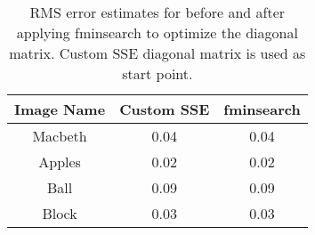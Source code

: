 \documentclass[12pt]{report}
\begin{document}
\begin{enumerate}
    \begin{table}[h!]
    \begin{center}
    \begin{tabular}{ | c | c | c | } 
        \hline
        Image Name & Custom SSE & fminsearch \\ 
        \hline \hline
        Macbeth & 0.04 & 0.04 \\  
        Apples & 0.02 & 0.02 \\ 
        Ball & 0.09 & 0.09 \\ 
        Block & 0.03 & 0.03 \\ 
        \hline
    \end{tabular}
    \caption{RMS error estimates for before and after applying fminsearch to optimize the diagonal matrix. Custom SSE diagonal matrix is used as start point.}
    \label{tab:Table5}
    \end{center}
    \end{table}
    

\end{enumerate}
\end{document}
